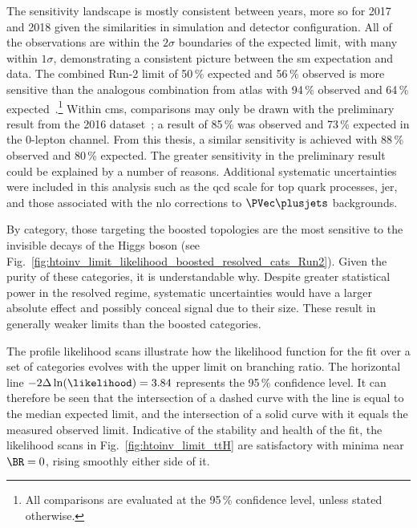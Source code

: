 The sensitivity landscape is mostly consistent between years, more so for 2017 and 2018 given the similarities in simulation and detector configuration. All of the observations are within the $\text{2}\sigma$ boundaries of the expected limit, with many within $\text{1}\sigma$, demonstrating a consistent picture between the \acrshort{sm} expectation and data. The combined Run-2 limit of 50\,\% expected and 56\,\% observed is more sensitive than the analogous combination from \acrshort{atlas} with 94\,\% observed and 64\,\% expected~\cite{ATLAS:2020kdi}.\footnote{All comparisons are evaluated at the 95\,\% confidence level, unless stated otherwise.} Within \acrshort{cms}, comparisons may only be drawn with the preliminary result from the 2016 dataset~\cite{CMS-PAS-HIG-18-008}; a result of 85\,\% was observed and 73\,\% expected in the 0-lepton channel. From this thesis, a similar sensitivity is achieved with 88\,\% observed and 80\,\% expected. The greater sensitivity in the preliminary result could be explained by a number of reasons. Additional systematic uncertainties were included in this analysis such as the \acrshort{qcd} scale for top quark processes, \acrlong{jer}, and those associated with the \acrshort{nlo} corrections to $\PVec \plusjets$ backgrounds.

By category, those targeting the boosted topologies are the most sensitive to the invisible decays of the Higgs boson (see Fig.~\ref{fig:htoinv_limit_likelihood_boosted_resolved_cats_Run2}). Given the purity of these categories, it is understandable why. Despite greater statistical power in the resolved regime, systematic uncertainties would have a larger absolute effect and possibly conceal signal due to their size. These result in generally weaker limits than the boosted categories.

The profile likelihood scans illustrate how the likelihood function for the fit over a set of categories evolves with the upper limit on branching ratio. The horizontal line $-\text{2}\Delta \ln(\likelihood) = \text{3.84}$ represents the 95\,\% confidence level. It can therefore be seen that the intersection of a dashed curve with the line is equal to the median expected limit, and the intersection of a solid curve with it equals the measured observed limit. Indicative of the stability and health of the fit, the likelihood scans in Fig.~\ref{fig:htoinv_limit_ttH} are satisfactory with minima near $\BR = \text{0}$, rising smoothly either side of it.




